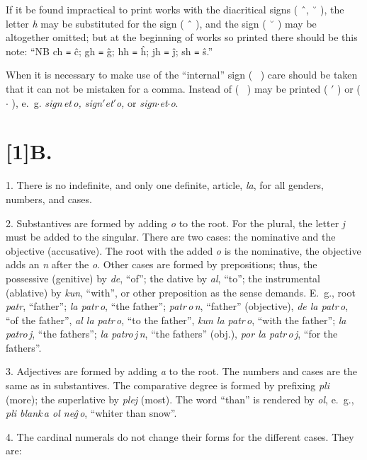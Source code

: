 \documentclass[12pt,twoside]{book}
\begin{document}
If it be found impractical to print works with the diacritical signs ( ˆ, ˘ ), the letter \emph{h} may be substituted for the sign ( ˆ ), and the sign ( ˘ ) may be altogether omitted; but at the beginning of works so printed there should be this note: ``NB ch \texttt{=} ĉ; gh \texttt{=} ĝ; hh \texttt{=} ĥ; jh \texttt{=} ĵ; sh \texttt{=} ŝ.''

When it is necessary to make use of the ``internal'' sign ( \, ) care should be taken that it can not be mistaken for a comma.  Instead of ( \, ) may be printed ( {$'$} ) or ( $\cdot$ ), e.~g. \emph{sign\,et\,o, sign{$'$}et{$'$}o,} or \emph{sign$\cdot$et$\cdot$o}.

\section*{\scalebox{0.8}[1]B. \hspace{.2em} }

1. There is no indefinite, and only one definite, article, \emph{la}, for all genders, numbers, and cases.

2. Substantives are formed by adding \emph{o} to the root. For the plural, the letter \emph{j} must be added to the singular. There are two cases: the nominative and the objective (accusative). The root with the added \emph{o} is the nominative, the objective adds an \emph{n} after the \emph{o}. Other cases are formed by prepositions; thus, the possessive (genitive) by \emph{de}, “of”; the dative by \emph{al}, “to”; the instrumental (ablative) by \emph{kun}, “with”, or other preposition as the sense demands. E.~g., root \emph{patr}, “father”; \emph{la patr\,o}, “the father”; \emph{patr\,o\,n}, “father” (objective), \emph{de la patr\,o}, “of the father”, \emph{al la patr\,o}, “to the father”, \emph{kun la patr\,o}, “with the father”; \emph{la patro\,j}, “the fathers”; \emph{la patro\,j\,n}, “the fathers” (obj.), \emph{por la patr\,o\,j}, “for the fathers”.

3. Adjectives are formed by adding \emph{a} to the root. The numbers and cases are the same as in substantives. The comparative degree is formed by prefixing \emph{pli} (more); the superlative by \emph{plej} (most). The word “than” is rendered by \emph{ol}, e.~g., \emph{pli blank\,a ol neĝ\,o}, “whiter than snow”.

4. The cardinal numerals do not change their forms for the different cases. They are:
\end{document}
